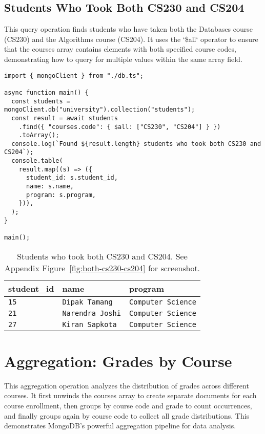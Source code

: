 \subsection{Students Who Took Both CS230 and CS204}
This query operation finds students who have taken both the Databases course (CS230) and the Algorithms course (CS204). It uses the `\$all` operator to ensure that the courses array contains elements with both specified course codes, demonstrating how to query for multiple values within the same array field.

\begin{verbatim}
import { mongoClient } from "./db.ts";

async function main() {
  const students = mongoClient.db("university").collection("students");
  const result = await students
    .find({ "courses.code": { $all: ["CS230", "CS204"] } })
    .toArray();
  console.log(`Found ${result.length} students who took both CS230 and CS204`);
  console.table(
    result.map((s) => ({
      student_id: s.student_id,
      name: s.name,
      program: s.program,
    })),
  );
}

main();
\end{verbatim}

\begin{table}[H]
  \centering
  \begin{tabular}{|l|l|l|}
    \hline
    \textbf{student\_id} & \textbf{name} & \textbf{program} \\
    \hline
    \texttt{15} & \texttt{Dipak Tamang} & \texttt{Computer Science} \\
    \texttt{21} & \texttt{Narendra Joshi} & \texttt{Computer Science} \\
    \texttt{27} & \texttt{Kiran Sapkota} & \texttt{Computer Science} \\
    \hline
  \end{tabular}
  \caption{Students who took both CS230 and CS204. See Appendix Figure~\ref{fig:both-cs230-cs204} for screenshot.}
\end{table}

\section{Aggregation: Grades by Course}
This aggregation operation analyzes the distribution of grades across different courses. It first unwinds the courses array to create separate documents for each course enrollment, then groups by course code and grade to count occurrences, and finally groups again by course code to collect all grade distributions. This demonstrates MongoDB's powerful aggregation pipeline for data analysis.

